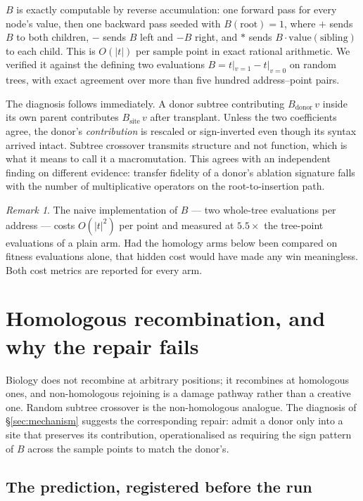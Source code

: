 \documentclass[11pt,a4paper]{article}
\theoremstyle{definition}
\theoremstyle{remark}
\newtheorem{remark}{Remark}[section]
\begin{document}
$B$ is exactly computable by reverse accumulation: one forward pass for every
node's value, then one backward pass seeded with $B(\text{root}) = 1$, where $+$
sends $B$ to both children, $-$ sends $B$ left and $-B$ right, and $*$ sends
$B\cdot\text{value}(\text{sibling})$ to each child. This is $O(|t|)$ per sample
point in exact rational arithmetic. We verified it against the defining two
evaluations $B = t|_{v=1} - t|_{v=0}$ on random trees, with exact agreement over
more than five hundred address--point pairs.

The diagnosis follows immediately. A donor subtree contributing
$B_{\text{donor}}\,v$ inside its own parent contributes $B_{\text{site}}\,v$
after transplant. Unless the two coefficients agree, the donor's
\emph{contribution} is rescaled or sign-inverted even though its syntax arrived
intact. Subtree crossover transmits structure and not function, which is what it
means to call it a macromutation. This agrees with an independent finding on
different evidence: transfer fidelity of a donor's ablation signature falls with
the number of multiplicative operators on the root-to-insertion path.

\begin{remark}
The naive implementation of $B$ --- two whole-tree evaluations per address ---
costs $O(|t|^2)$ per point and measured at $5.5\times$ the tree-point
evaluations of a plain arm. Had the homology arms below been compared on fitness
evaluations alone, that hidden cost would have made any win meaningless. Both
cost metrics are reported for every arm.
\end{remark}

\section{Homologous recombination, and why the repair fails}\label{sec:homology}

Biology does not recombine at arbitrary positions; it recombines at homologous
ones, and non-homologous rejoining is a damage pathway rather than a creative
one. Random subtree crossover is the non-homologous analogue. The diagnosis of
\S\ref{sec:mechanism} suggests the corresponding repair: admit a donor only into
a site that preserves its contribution, operationalised as requiring the sign
pattern of $B$ across the sample points to match the donor's.

\subsection{The prediction, registered before the run}
\end{document}
